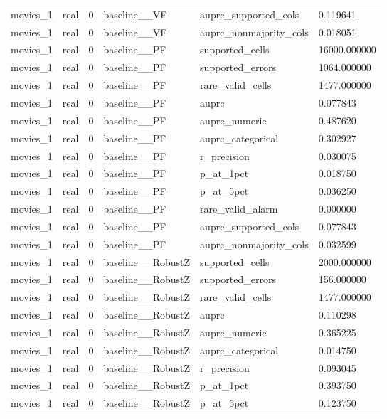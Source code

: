 \begin{tabular}{llllll}
movies\_1 & real & 0 & baseline\_\_VF & auprc\_supported\_cols & 0.119641 \\
movies\_1 & real & 0 & baseline\_\_VF & auprc\_nonmajority\_cols & 0.018051 \\
movies\_1 & real & 0 & baseline\_\_PF & supported\_cells & 16000.000000 \\
movies\_1 & real & 0 & baseline\_\_PF & supported\_errors & 1064.000000 \\
movies\_1 & real & 0 & baseline\_\_PF & rare\_valid\_cells & 1477.000000 \\
movies\_1 & real & 0 & baseline\_\_PF & auprc & 0.077843 \\
movies\_1 & real & 0 & baseline\_\_PF & auprc\_numeric & 0.487620 \\
movies\_1 & real & 0 & baseline\_\_PF & auprc\_categorical & 0.302927 \\
movies\_1 & real & 0 & baseline\_\_PF & r\_precision & 0.030075 \\
movies\_1 & real & 0 & baseline\_\_PF & p\_at\_1pct & 0.018750 \\
movies\_1 & real & 0 & baseline\_\_PF & p\_at\_5pct & 0.036250 \\
movies\_1 & real & 0 & baseline\_\_PF & rare\_valid\_alarm & 0.000000 \\
movies\_1 & real & 0 & baseline\_\_PF & auprc\_supported\_cols & 0.077843 \\
movies\_1 & real & 0 & baseline\_\_PF & auprc\_nonmajority\_cols & 0.032599 \\
movies\_1 & real & 0 & baseline\_\_RobustZ & supported\_cells & 2000.000000 \\
movies\_1 & real & 0 & baseline\_\_RobustZ & supported\_errors & 156.000000 \\
movies\_1 & real & 0 & baseline\_\_RobustZ & rare\_valid\_cells & 1477.000000 \\
movies\_1 & real & 0 & baseline\_\_RobustZ & auprc & 0.110298 \\
movies\_1 & real & 0 & baseline\_\_RobustZ & auprc\_numeric & 0.365225 \\
movies\_1 & real & 0 & baseline\_\_RobustZ & auprc\_categorical & 0.014750 \\
movies\_1 & real & 0 & baseline\_\_RobustZ & r\_precision & 0.093045 \\
movies\_1 & real & 0 & baseline\_\_RobustZ & p\_at\_1pct & 0.393750 \\
movies\_1 & real & 0 & baseline\_\_RobustZ & p\_at\_5pct & 0.123750 \\

\end{tabular}
